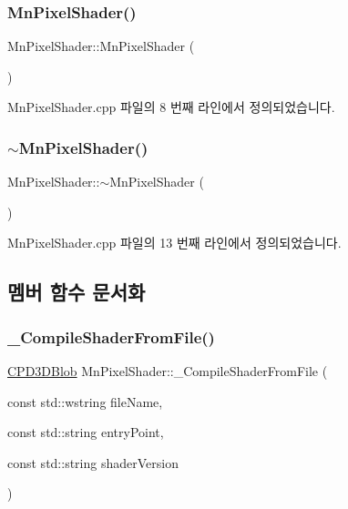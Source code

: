 \subsubsection{\texorpdfstring{Mn\+Pixel\+Shader()}{MnPixelShader()}}
{\footnotesize\ttfamily Mn\+Pixel\+Shader\+::\+Mn\+Pixel\+Shader (\begin{DoxyParamCaption}{ }\end{DoxyParamCaption})}



Mn\+Pixel\+Shader.\+cpp 파일의 8 번째 라인에서 정의되었습니다.

\mbox{\label{class_m_n_l_1_1_mn_pixel_shader_a1cf973996fa4f7cf4155fee3ee32c3b6}} 
\subsubsection{\texorpdfstring{$\sim$\+Mn\+Pixel\+Shader()}{~MnPixelShader()}}
{\footnotesize\ttfamily Mn\+Pixel\+Shader\+::$\sim$\+Mn\+Pixel\+Shader (\begin{DoxyParamCaption}{ }\end{DoxyParamCaption})}



Mn\+Pixel\+Shader.\+cpp 파일의 13 번째 라인에서 정의되었습니다.



\subsection{멤버 함수 문서화}
\mbox{\label{class_m_n_l_1_1_mn_pixel_shader_a66c1b5bfd8873fefe111e74609066b4c}} 
\subsubsection{\texorpdfstring{\+\_\+\+Compile\+Shader\+From\+File()}{\_CompileShaderFromFile()}}
{\footnotesize\ttfamily \hyperlink{namespace_m_n_l_a3716e3bee60c31fe1b7b5dd5a82db59a}{C\+P\+D3\+D\+Blob} Mn\+Pixel\+Shader\+::\+\_\+\+Compile\+Shader\+From\+File (\begin{DoxyParamCaption}\item[{const std\+::wstring}]{file\+Name,  }\item[{const std\+::string}]{entry\+Point,  }\item[{const std\+::string}]{shader\+Version }\end{DoxyParamCaption})\hspace{0.3cm}{\ttfamily [private]}}



